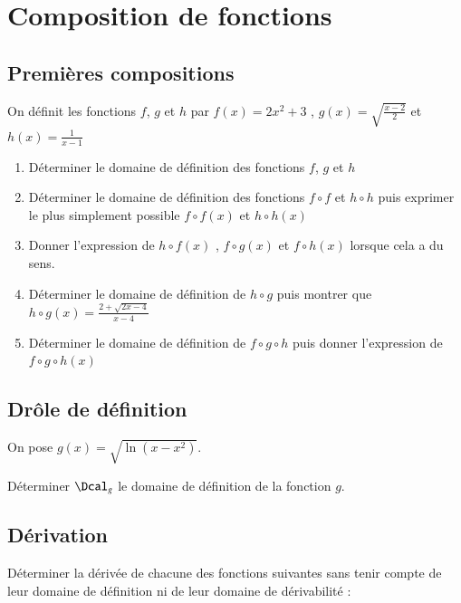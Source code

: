 \documentclass[oneside,12pt]{article}          %
\begin{document}
\section{Composition de fonctions}

\subsection{Premières compositions}
On définit les fonctions $f$, $g$ et $h$ par $f(x)=2x^2+3$ , $g(x)=\sqrt{\frac{x-2}{2}}$ et $h(x)=\frac{1}{x-1}$
\begin{enumerate}
	\item Déterminer le domaine de définition des fonctions $f$, $g$ et $h$
	\item Déterminer le domaine de définition des fonctions $f\circ f$ et $h\circ h$ puis exprimer le plus simplement possible $f\circ f(x)$ et $h\circ h(x)$
	\item Donner l'expression de $h\circ f(x)$ , $f\circ g(x)$ et $f \circ h(x)$ lorsque cela a du sens.
	\item Déterminer le domaine de définition de $h\circ g$ puis montrer que $h \circ g (x) = \frac{2+\sqrt{2x-4}}{x-4}$ 
	\item Déterminer le domaine de définition de $f\circ g \circ h$ puis donner l'expression de $f \circ g \circ h (x)$
\end{enumerate}



\subsection{Drôle de définition}
On pose $g(x)=\sqrt{\ln(x-x^2)}$.

Déterminer $\Dcal_g$ le domaine de définition de la fonction $g$.



\subsection{Dérivation}
Déterminer la dérivée de chacune des fonctions suivantes sans tenir compte de leur domaine de définition ni de leur domaine de dérivabilité :
\end{document}
